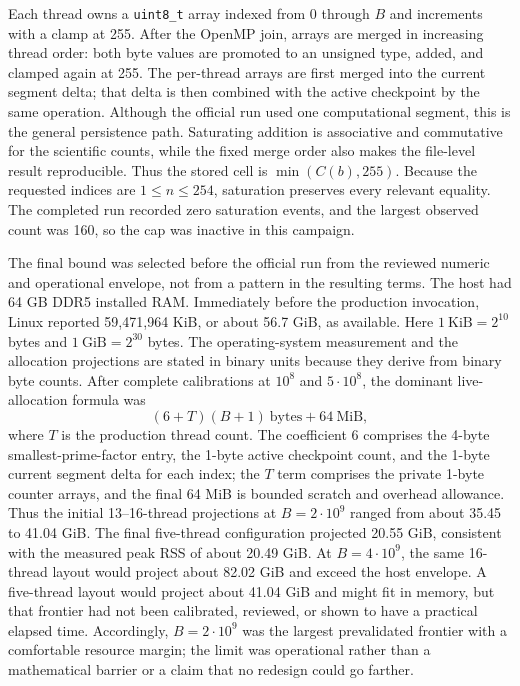 \documentclass[11pt]{article}
\begin{document}
Each thread owns a \texttt{uint8\_t} array indexed from 0 through $B$ and
increments with a clamp at 255.  After the OpenMP join, arrays are merged in
increasing thread order: both byte values are promoted to an unsigned type,
added, and clamped again at 255.  The per-thread arrays are first merged into
the current segment delta; that delta is then combined with the active
checkpoint by the same operation.  Although the official run used one
computational segment, this is the general persistence path.  Saturating
addition is associative and
commutative for the scientific counts, while the fixed merge order also makes
the file-level result reproducible.  Thus the stored cell is
$\min(C(b),255)$.  Because the requested indices are
$1\leq n\leq254$, saturation preserves every relevant equality.  The
completed run recorded zero saturation events, and the largest observed
count was 160, so the cap was inactive in this campaign.

The final bound was selected before the official run from the reviewed
numeric and operational envelope, not from a pattern in the resulting terms.
The host had 64 GB DDR5 installed RAM.  Immediately before the production invocation, Linux reported
59,471,964 KiB, or about 56.7 GiB, as available.  Here
$1\ \mathrm{KiB}=2^{10}$ bytes and $1\ \mathrm{GiB}=2^{30}$ bytes.  The
operating-system measurement and the allocation projections are stated in
binary units because they derive from binary byte counts.  After
complete calibrations at $10^8$ and $5\cdot10^8$, the dominant live-allocation
formula was
\[
 (6+T)(B+1)\ \text{bytes}+64\ \mathrm{MiB},
\]
where $T$ is the production thread count.  The coefficient 6 comprises the
4-byte smallest-prime-factor entry, the 1-byte active checkpoint count, and
the 1-byte current segment delta for each index; the $T$ term comprises the
private 1-byte counter arrays, and the final 64 MiB is bounded scratch and
overhead allowance.  Thus the initial 13--16-thread
projections at $B=2\cdot10^9$ ranged from about 35.45 to 41.04 GiB.  The final
five-thread configuration projected 20.55 GiB, consistent with the measured
peak RSS of about 20.49 GiB.  At $B=4\cdot10^9$, the same 16-thread layout
would project about 82.02 GiB and exceed the host envelope.  A five-thread
layout would project about 41.04 GiB and might fit in memory, but that frontier
had not been calibrated, reviewed, or shown to have a practical elapsed time.
Accordingly, $B=2\cdot10^9$ was the largest prevalidated frontier with a
comfortable resource margin; the limit was operational rather than a
mathematical barrier or a claim that no redesign could go farther.
\end{document}
